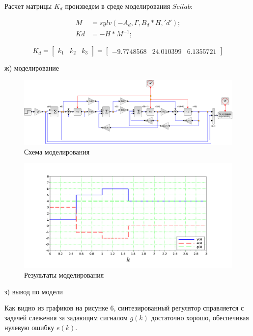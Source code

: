 \documentclass[a4paper,14pt]{extreport}
\begin{document}
Расчет матрицы $K_d$ произведем в среде моделирования $Scilab$:

\begin{align}
	M &= sylv(-A_d,\Gamma, B_d * H, 'd');\\
	Kd &= -H * M^{-1};
\end{align} 

\begin{equation}
K_d = 
	\begin{bmatrix}
k_1 &   k_2 & k_3   
\end{bmatrix}=
	\begin{bmatrix}
	      - 9.7748568  &  24.010399 &   6.1355721    
	\end{bmatrix}
\end{equation}

ж) моделирование

\begin{figure}[H]
	\center\includegraphics[width=1\linewidth]{model_sch.png}
	\caption{Схема моделирования}
	\label{fig:scr1}
\end{figure}
\begin{figure}[H]
	\center\includegraphics[width=1\linewidth]{model_res.png}
	\caption{Результаты моделирования }
	\label{fig:scr1}
\end{figure}

з) вывод по модели

Как видно из графиков на рисунке 6, синтезированный регулятор справляется с
задачей слежения за задающим сигналом  $g(k)$ достаточно хорошо, обеспечивая
нулевую ошибку $e(k)$.
\end{document}
